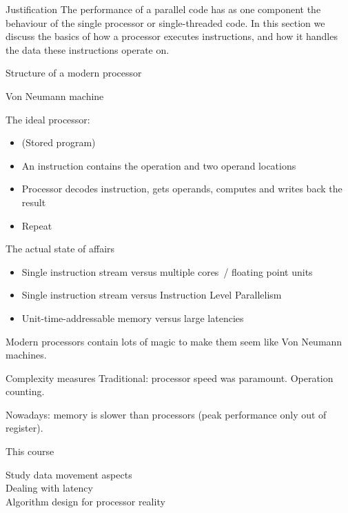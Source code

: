 
\begin{frame}{Justification}
The performance of a parallel code has as one component
the behaviour of the single processor or single-threaded code. 
In this section we discuss the basics of how a processor
executes instructions, and how it handles the data
these instructions operate on.
\end{frame}

 {Structure of a modern processor}

\begin{frame}{Von Neumann machine}

The ideal processor:
\begin{itemize}
\item (Stored program)
\item An instruction contains the operation and two operand locations
\item Processor decodes instruction, gets operands, computes and writes back the result
\item Repeat
\end{itemize}

\end{frame}

\begin{frame}{The actual state of affairs}

  \begin{itemize}
  \item Single instruction stream versus multiple cores~/ floating point units
  \item Single instruction stream versus Instruction Level Parallelism
  \item Unit-time-addressable memory versus large latencies
  \end{itemize}
  Modern processors contain lots of magic to make them seem like Von Neumann machines.
\end{frame}

\begin{frame}{Complexity measures}
  Traditional: processor speed was paramount. Operation counting.

  Nowadays: memory is slower than processors (peak performance only
  out of register). 

    \begin{block}{This course}

      Study data movement aspects\\
      Dealing with latency\\
      Algorithm design for processor reality
    \end{block}
\end{frame}

